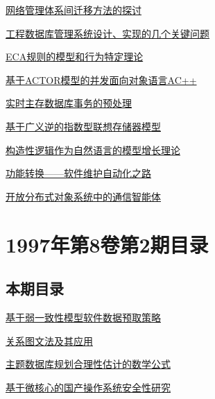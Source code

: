 \documentclass[a4paper]{article}
\begin{document}
\href{http://www.jos.org.cn/ch/reader/download_pdf.aspx?file_no=19970303&year_id=1997&quarter_id=3&falg=1}{网络管理体系间迁移方法的探讨}

\href{http://www.jos.org.cn/ch/reader/download_pdf.aspx?file_no=19970304&year_id=1997&quarter_id=3&falg=1}{工程数据库管理系统设计、实现的几个关键问题}

\href{http://www.jos.org.cn/ch/reader/download_pdf.aspx?file_no=19970305&year_id=1997&quarter_id=3&falg=1}{ECA规则的模型和行为特定理论}

\href{http://www.jos.org.cn/ch/reader/download_pdf.aspx?file_no=19970306&year_id=1997&quarter_id=3&falg=1}{基于ACTOR模型的并发面向对象语言AC++}

\href{http://www.jos.org.cn/ch/reader/download_pdf.aspx?file_no=19970307&year_id=1997&quarter_id=3&falg=1}{实时主存数据库事务的预处理}

\href{http://www.jos.org.cn/ch/reader/download_pdf.aspx?file_no=19970308&year_id=1997&quarter_id=3&falg=1}{基于广义逆的指数型联想存储器模型}

\href{http://www.jos.org.cn/ch/reader/download_pdf.aspx?file_no=19970309&year_id=1997&quarter_id=3&falg=1}{构造性逻辑作为自然语言的模型增长理论}

\href{http://www.jos.org.cn/ch/reader/download_pdf.aspx?file_no=19970310&year_id=1997&quarter_id=3&falg=1}{功能转换——软件维护自动化之路}

\href{http://www.jos.org.cn/ch/reader/download_pdf.aspx?file_no=19970312&year_id=1997&quarter_id=3&falg=1}{开放分布式对象系统中的通信智能体}


\section{\textbf{1997年第8卷第2期目录}}
\subsection{本期目录}
\href{http://www.jos.org.cn/ch/reader/download_pdf.aspx?file_no=19970201&year_id=1997&quarter_id=2&falg=1}{基于弱一致性模型软件数据预取策略}

\href{http://www.jos.org.cn/ch/reader/download_pdf.aspx?file_no=19970202&year_id=1997&quarter_id=2&falg=1}{关系图文法及其应用}

\href{http://www.jos.org.cn/ch/reader/download_pdf.aspx?file_no=19970203&year_id=1997&quarter_id=2&falg=1}{主题数据库规划合理性估计的数学公式}

\href{http://www.jos.org.cn/ch/reader/download_pdf.aspx?file_no=19970204&year_id=1997&quarter_id=2&falg=1}{基于微核心的国产操作系统安全性研究}
\end{document}
